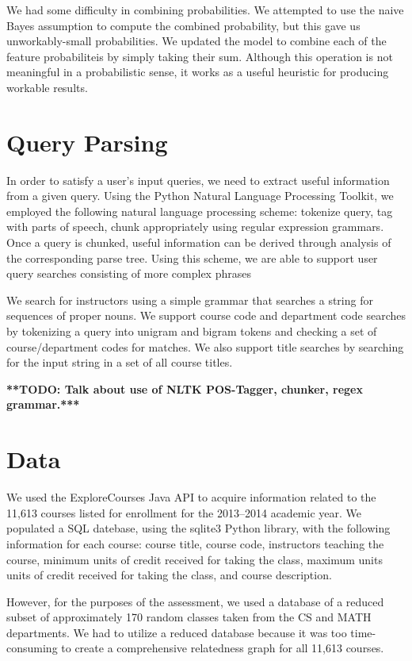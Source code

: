 \documentclass[12pt]{article}
\newcommand{\todo}[1]{{\Large \bf ***TODO: #1***}}
\begin{document}
We had some difficulty in combining probabilities. We attempted to use
the naive Bayes assumption to compute the combined probability, but
this gave us unworkably-small probabilities. We updated the model to
combine each of the feature probabiliteis by simply taking their
sum. Although this operation is not meaningful in a probabilistic
sense, it works as a useful heuristic for producing workable results.

\section*{Query Parsing}
In order to satisfy a user's input queries, we need to extract useful
information from a given query. Using the Python Natural Language
Processing Toolkit, we employed the following natural language
processing scheme: tokenize query, tag with parts of speech, chunk
appropriately using regular expression grammars. Once a query is
chunked, useful information can be derived through analysis of the
corresponding parse tree. Using this scheme, we are able to support
user query searches consisting of more complex phrases

We search for instructors using a simple grammar that searches a
string for sequences of proper nouns. We support course code and
department code searches by tokenizing a query into unigram and bigram
tokens and checking a set of course/department codes for matches. We
also support title searches by searching for the input string in a set
of all course titles.

\todo{Talk about use of NLTK POS-Tagger, chunker, regex grammar.}

\section*{Data}
We used the ExploreCourses Java API to acquire information related to
the 11,613 courses listed for enrollment for the 2013–2014 academic
year. We populated a SQL datebase, using the sqlite3 Python library,
with the following information for each course: course title, course
code, instructors teaching the course, minimum units of credit
received for taking the class, maximum units units of credit received
for taking the class, and course description.

However, for the purposes of the assessment, we used a database of a
reduced subset of approximately 170 random classes taken from the CS
and MATH departments. We had to utilize a reduced database because it
was too time-consuming to create a comprehensive relatedness graph for
all 11,613 courses.
\end{document}
